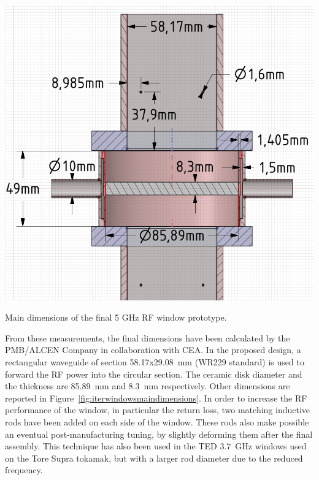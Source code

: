 \begin{marginfigure}[-3cm]
	\centering
	\includegraphics[width=1.0\linewidth]{figures/chap3/ITER_window/ITER_windows_main_dimensions}
	\caption{Main dimensions of the final 5 GHz RF window prototype. }
	\label{fig:iterwindowsmaindimensions}
\end{marginfigure}

From these measurements, the final dimensions have been calculated by the PMB/ALCEN Company in collaboration with CEA. In the proposed design, a rectangular waveguide of section 58.17x29.08~\si{mm} (WR229 standard) is used to forward the RF power into the circular section. The ceramic disk diameter and the thickness are 85.89~mm and 8.3~mm respectively. Other dimensions are reported in Figure~\ref{fig:iterwindowsmaindimensions}. In order to increase the RF performance of the window, in particular the return loss, two matching inductive rods have been added on each side of the window. These rods also make possible an eventual post-manufacturing tuning, by slightly deforming them after the final assembly. This technique has also been used in the TED 3.7~GHz windows used on the Tore Supra tokamak, but with a larger rod diameter due to the reduced frequency. 

